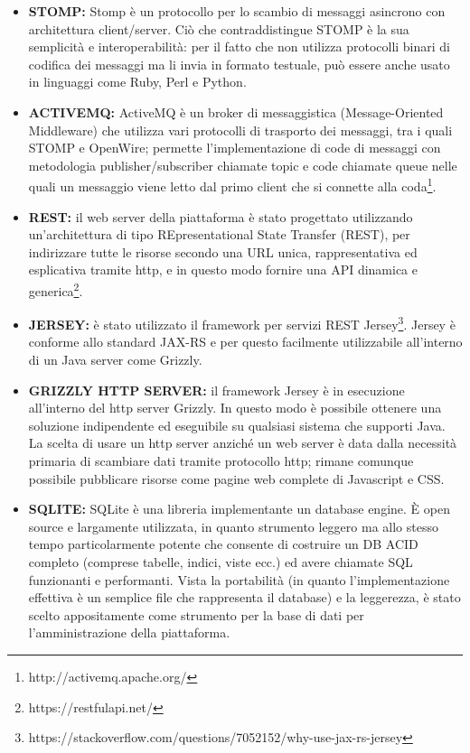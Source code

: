 \begin{itemize}
	\item \textbf{STOMP:} Stomp è un protocollo per lo scambio di messaggi asincrono con architettura client/server.
	Ciò che contraddistingue STOMP è la sua semplicità e interoperabilità: per il fatto che non utilizza
	protocolli binari di codifica dei messaggi ma li invia in formato testuale, può essere anche usato in
	linguaggi come Ruby, Perl e Python.
	\item \textbf{ACTIVEMQ:} ActiveMQ è un broker di messaggistica (Message-Oriented Middleware) che utilizza vari protocolli di trasporto dei messaggi, tra i quali STOMP e OpenWire; permette l’implementazione di code di messaggi con metodologia publisher/subscriber chiamate topic e code chiamate queue nelle quali un messaggio viene letto dal primo client che si connette alla coda\footnote{http://activemq.apache.org/}.
	\item \textbf{REST:} il web server della piattaforma è stato progettato utilizzando un’architettura di tipo REpresentational State Transfer (REST), per indirizzare tutte le risorse secondo una URL unica, rappresentativa ed esplicativa tramite http, e in questo modo fornire una API dinamica e generica\footnote{https://restfulapi.net/}.
	\item \textbf{JERSEY:} è stato utilizzato il framework per servizi REST Jersey\footnote{https://stackoverflow.com/questions/7052152/why-use-jax-rs-jersey}. Jersey è conforme allo standard JAX-RS e per questo facilmente utilizzabile all'interno di un Java server come Grizzly.
	\item \textbf{GRIZZLY HTTP SERVER:} il framework Jersey è in esecuzione all’interno del http server Grizzly. In questo modo è possibile ottenere una soluzione indipendente ed eseguibile su qualsiasi sistema che supporti Java. La scelta di usare un http server anziché un web server è data dalla necessità primaria di scambiare dati tramite protocollo http; rimane comunque possibile pubblicare risorse come pagine web complete di Javascript e CSS.
	\item \textbf{SQLITE:} SQLite è una libreria implementante un database engine. È open source e largamente utilizzata, in quanto strumento leggero ma allo stesso tempo particolarmente potente che consente di costruire un DB ACID completo (comprese tabelle, indici, viste ecc.) ed avere chiamate SQL funzionanti e performanti. Vista la portabilità (in quanto l’implementazione effettiva è un semplice file che rappresenta il database) e la leggerezza, è stato scelto appositamente come strumento per la base di dati per l’amministrazione della piattaforma.

\end{itemize}
